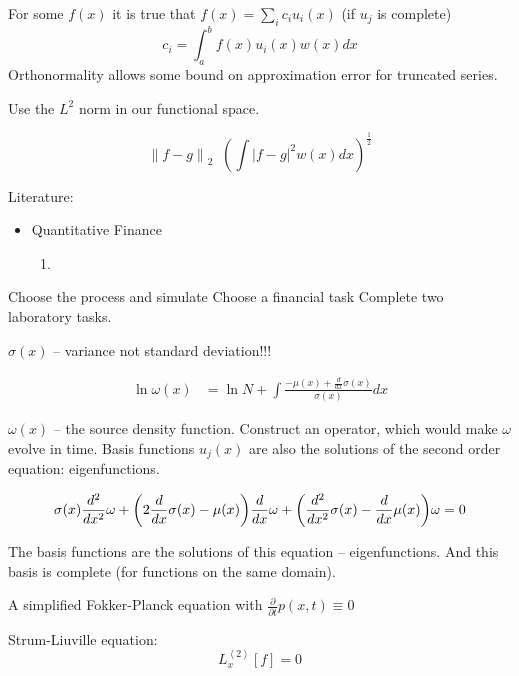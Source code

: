 \documentclass[a4paper]{article}
\newcommand{\clo}[1]{{\left [ #1 \right ]}}
\newcommand{\brac}[1]{{\left ( #1 \right )}}
\newcommand{\abs}[1]{{\left | #1 \right |}}
\newcommand{\nrm}[1]{{\left\| #1 \right \|}}
\newcommand{\brkt}[1]{{\left\langle #1 \right\rangle}}
\newcommand{\defn}{\mathop{\overset{\Delta}{=}}\nolimits}
\begin{document}
For some $f(x)$  it is true that $f(x) = \sum_i c_i u_i(x)$ (if $u_j$ is complete) \[
c_i = \int_a^b f(x)u_i(x)w(x)dx
\]
Orthonormality allows some bound on approximation error for truncated series.

Use the $L^2$ norm in our functional space.

\[\nrm{f-g}_2 \defn \brac{\int \abs{f-g}^2 w(x) dx}^\frac{1}{2}\]



Literature:
\begin{itemize}
	\item Quantitative Finance
	\begin{enumerate}
		\item 
	\end{enumerate}
\end{itemize}

Choose the process and simulate
Choose a financial task
Complete two laboratory tasks.

$\sigma(x)$ -- variance not standard deviation!!!

\begin{align*}
	\ln \omega(x) &= \ln N + \int \frac{ - \mu(x) + \frac{d}{dx} \sigma(x)}{\sigma(x)} dx
\end{align*}

$\omega(x)$ -- the source density function. Construct an operator, which would make $\omega$ evolve in time.
Basis functions $u_j(x)$ are also the solutions of the second order equation: eigenfunctions. 

\[
  \sigma(x) \frac{d^2}{dx^2} \omega \\
+ \brac{ 2\frac{d}{dx}\sigma(x) - \mu(x) } \frac{d}{dx} \omega \\
+ \brac{ \frac{d^2}{dx^2}\sigma(x) - \frac{d}{dx}\mu(x) } \omega \\
= 0
\]

The basis functions are the solutions of this equation -- eigenfunctions.
And this basis is complete (for functions on the same domain).

A simplified Fokker-Planck equation with $ \frac{\partial}{\partial t} p(x,t) \equiv 0$


Strum-Liuville equation:
\[L_x^\brkt{2}\clo{f} = 0\]
\end{document}
